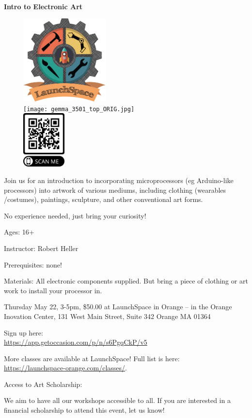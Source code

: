 \documentclass[12pt]{article}
\begin{document}
{\centering \LARGE \textbf{Intro to Electronic Art\\}}

\vspace{.5in}

\begin{figure}
\centering
\includegraphics[width=0.4\textwidth]{Copy-of-launchSpace_Color-copy.png}\\
\vspace{12pt}
\texttt{[image: gemma\_3501\_top\_ORIG.jpg]}\\
\vspace{12pt}
\includegraphics[width=0.2\textwidth]{LaunchSpaceGemmaClass.png}
\end{figure}


 
{\Large

Join us for an introduction to incorporating microprocessors (eg Arduino-like 
processors) into artwork of various mediums, including clothing (wearables /costumes), paintings, sculpture, and other conventional art forms. 

No experience needed, just bring your curiosity!

Ages: 16+

Instructor: Robert Heller

Prerequisites: none!

Materials:  All electronic components supplied.  But bring a piece of clothing 
or art work to install your processor in. 

Thursday May 22, 3-5pm, \$50.00 at LaunchSpace in Orange -- in the Orange 
Inovation Center, 131 West Main Street, Suite 342
Orange MA 01364

}

\vspace{12pt}

Sign up here: \\
\url{https://app.getoccasion.com/p/n/s6PgqCkP/v5} 

More classes are available at LaunchSpace! Full list is here: \\
\url{https://launchspace-orange.com/classes/}.

Access to Art Scholarship:

We aim to have all our workshops accessible to all. If you are interested in a 
financial scholarship to attend this event, let us know! 
\end{document}
